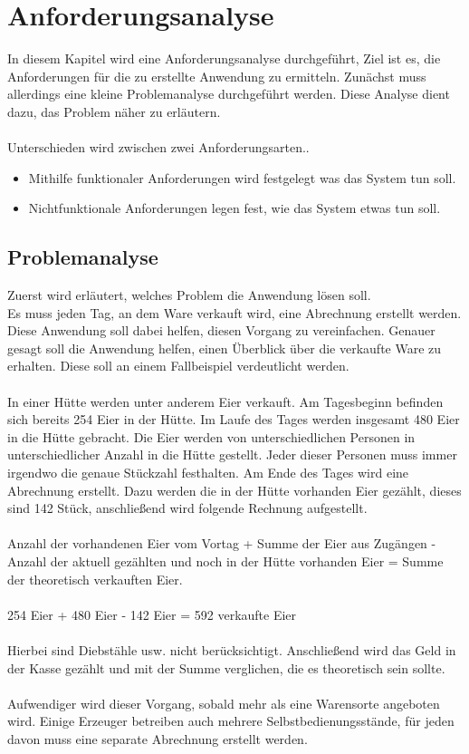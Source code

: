 \section{Anforderungsanalyse}\label{anforderungsanalyse}

In diesem Kapitel wird eine Anforderungsanalyse durchgeführt, Ziel ist es, die Anforderungen für die zu erstellte Anwendung zu ermitteln. 
Zunächst muss allerdings eine kleine Problemanalyse durchgeführt werden. Diese Analyse dient dazu, das Problem näher zu erläutern.
\\
\\
Unterschieden wird zwischen zwei Anforderungsarten.\cite{FunktionaleAnforderungen}.

\begin{itemize}
	\itemsep0pt
	\item Mithilfe funktionaler Anforderungen wird festgelegt was das System tun soll. 
	\item Nichtfunktionale Anforderungen legen fest, wie das System etwas tun soll. 
\end{itemize}

\subsection{Problemanalyse}\label{problem}
Zuerst wird erläutert, welches Problem die Anwendung lösen soll.
\\
Es muss jeden Tag, an dem Ware verkauft wird, eine Abrechnung erstellt werden. Diese Anwendung soll dabei helfen, diesen Vorgang zu vereinfachen. Genauer gesagt soll die Anwendung helfen, einen Überblick über die verkaufte Ware zu erhalten. Diese soll an einem Fallbeispiel verdeutlicht werden.
\\
\\
In einer Hütte werden unter anderem Eier verkauft. Am Tagesbeginn befinden sich bereits 254 Eier in der Hütte. Im Laufe des Tages werden insgesamt 480 Eier in die Hütte gebracht. Die Eier werden von unterschiedlichen Personen in unterschiedlicher Anzahl in die Hütte gestellt. Jeder dieser Personen muss immer irgendwo die genaue Stückzahl festhalten. Am Ende des Tages wird eine Abrechnung erstellt. Dazu werden die in der Hütte vorhanden Eier gezählt, dieses sind 142 Stück, anschließend wird folgende Rechnung aufgestellt.
\\
\\
Anzahl der vorhandenen Eier vom Vortag + Summe der Eier aus Zugängen - Anzahl der aktuell gezählten und noch in der Hütte vorhanden Eier = Summe der theoretisch verkauften Eier. 
\\
\\
254 Eier + 480 Eier - 142 Eier = 592 verkaufte Eier
\\
\\
Hierbei sind Diebstähle usw. nicht berücksichtigt. Anschließend wird das Geld in der Kasse gezählt und mit der Summe verglichen, die es theoretisch sein sollte.  
\\
\\
Aufwendiger wird dieser Vorgang, sobald mehr als eine Warensorte angeboten wird. Einige Erzeuger betreiben auch mehrere Selbstbedienungsstände, für jeden davon muss eine separate Abrechnung erstellt werden. 

